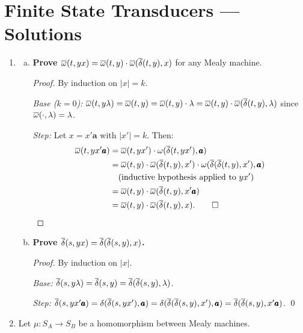 
\chapter{Finite State Transducers --- Solutions}

\begin{enumerate}[{7.}1.]

\item \begin{enumerate}[(a)]
  \item \textbf{Prove $\overline{\omega}(t,yx)=\overline{\omega}(t,y)\cdot\overline{\omega}(\overline{\delta}(t,y),x)$} for any Mealy machine.

  \begin{proof}
  By induction on $|x|=k$.

  \emph{Base ($k=0$):} $\overline{\omega}(t,y\lambda)=\overline{\omega}(t,y)=\overline{\omega}(t,y)\cdot\lambda=\overline{\omega}(t,y)\cdot\overline{\omega}(\overline{\delta}(t,y),\lambda)$ since $\overline{\omega}(\cdot,\lambda)=\lambda$.

  \emph{Step:}  Let $x=x'\pmb{a}$ with $|x'|=k$.  Then:
  \begin{align*}
    \overline{\omega}(t,yx'\pmb{a})
    &= \overline{\omega}(t,yx')\cdot\omega(\overline{\delta}(t,yx'),\pmb{a}) \\
    &= \overline{\omega}(t,y)\cdot\overline{\omega}(\overline{\delta}(t,y),x')\cdot\omega(\overline{\delta}(\overline{\delta}(t,y),x'),\pmb{a}) \\
    &\quad\text{(inductive hypothesis applied to $yx'$)} \\
    &= \overline{\omega}(t,y)\cdot\overline{\omega}(\overline{\delta}(t,y),x'\pmb{a}) \\
    &= \overline{\omega}(t,y)\cdot\overline{\omega}(\overline{\delta}(t,y),x). \qed
  \end{align*}
  \end{proof}

  \item \textbf{Prove $\overline{\delta}(s,yx)=\overline{\delta}(\overline{\delta}(s,y),x)$.}

  \begin{proof}
  By induction on $|x|$.

  \emph{Base:} $\overline{\delta}(s,y\lambda)=\overline{\delta}(s,y)=\overline{\delta}(\overline{\delta}(s,y),\lambda)$.

  \emph{Step:}  $\overline{\delta}(s,yx'\pmb{a})=\delta(\overline{\delta}(s,yx'),\pmb{a})=\delta(\overline{\delta}(\overline{\delta}(s,y),x'),\pmb{a})=\overline{\delta}(\overline{\delta}(s,y),x'\pmb{a})$. \qed
  \end{proof}
\end{enumerate}

\item Let $\mu:S_A\to S_B$ be a homomorphism between Mealy machines.


\end{enumerate}
